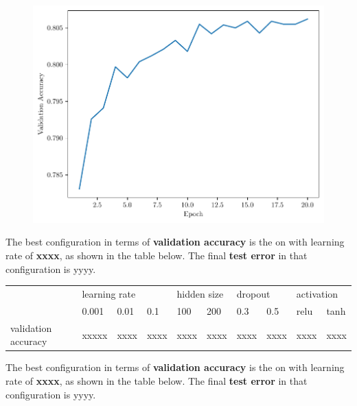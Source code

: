 \documentclass{exam}
\begin{document}
\begin{questions}
        \begin{figure}[H]
            \centering
            \includegraphics[scale = 0.75]{logistic_regression-validation-accuracy-0.01-sgd.pdf}
        \end{figure}

        \question
        The best configuration in terms of \textbf{validation accuracy} is the on with learning rate of \textbf{xxxx}, as shown in the table below. The final \textbf{test error} in that configuration is yyyy.

        \begin{table}[h!]
            \centering
            \begin{tabular}{l|lll|ll|ll|ll}
                                & \multicolumn{3}{l|}{learning rate}                            & \multicolumn{2}{l|}{hidden size} & \multicolumn{2}{l|}{dropout}     & \multicolumn{2}{l}{activation}   \\ \cline{2-10} 
                                & \multicolumn{1}{l|}{0.001} & \multicolumn{1}{l|}{0.01} & 0.1  & \multicolumn{1}{l|}{100}  & 200  & \multicolumn{1}{l|}{0.3}  & 0.5  & \multicolumn{1}{l|}{relu} & tanh \\ \hline
            validation accuracy & \multicolumn{1}{l|}{xxxxx} & \multicolumn{1}{l|}{xxxx} & xxxx & \multicolumn{1}{l|}{xxxx} & xxxx & \multicolumn{1}{l|}{xxxx} & xxxx & \multicolumn{1}{l|}{xxxx} & xxxx
            \end{tabular}
            \end{table}

        \question

        The best configuration in terms of \textbf{validation accuracy} is the on with learning rate of \textbf{xxxx}, as shown in the table below. The final \textbf{test error} in that configuration is yyyy.


\end{questions}
\end{document}
